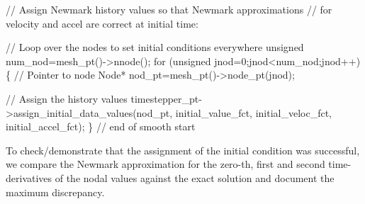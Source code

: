 \begin{DoxyCodeInclude}
   
   \textcolor{comment}{// Assign Newmark history values so that Newmark approximations}
   \textcolor{comment}{// for velocity and accel are correct at initial time:}

   \textcolor{comment}{// Loop over the nodes to set initial conditions everywhere}
   \textcolor{keywordtype}{unsigned} num\_nod=mesh\_pt()->nnode();
   \textcolor{keywordflow}{for} (\textcolor{keywordtype}{unsigned} jnod=0;jnod<num\_nod;jnod++)
    \{
     \textcolor{comment}{// Pointer to node}
     Node* nod\_pt=mesh\_pt()->node\_pt(jnod);
    
     \textcolor{comment}{// Assign the history values}
     timestepper\_pt->assign\_initial\_data\_values(nod\_pt, 
                                                initial\_value\_fct,
                                                initial\_veloc\_fct,
                                                initial\_accel\_fct);
    \} \textcolor{comment}{// end of smooth start}

\end{DoxyCodeInclude}


To check/demonstrate that the assignment of the initial condition was successful, we compare the Newmark approximation for the zero-\/th, first and second time-\/derivatives of the nodal values against the exact solution and document the maximum discrepancy.


